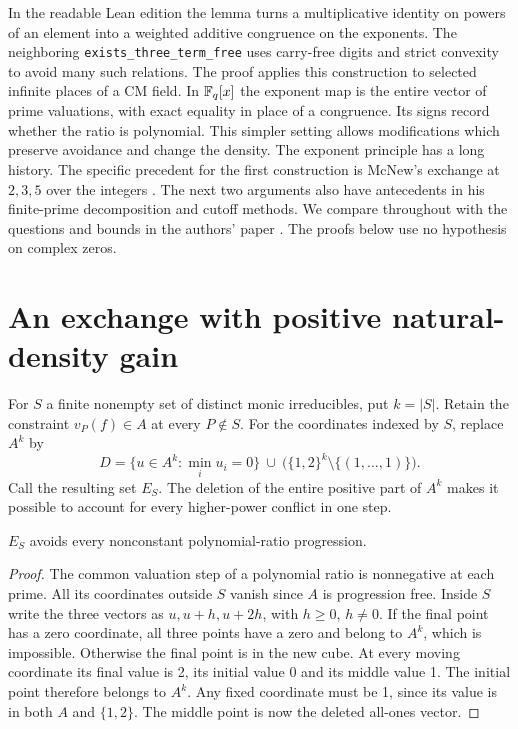 \documentclass[11pt]{article}
\begin{document}
In the readable Lean edition the lemma
turns a multiplicative identity on powers of an element into a weighted additive congruence on the exponents.
The neighboring \texttt{exists\_three\_term\_free} uses carry-free digits and strict convexity to avoid many such relations. The proof applies this construction to selected infinite places of a CM field. In $\mathbb F_q[x]$ the exponent map is the entire vector of prime valuations, with exact equality in place of a congruence. Its signs record whether the ratio is polynomial. This simpler setting allows modifications which preserve avoidance and change the density. The exponent principle has a long history. The specific precedent for the first construction is McNew's exchange at $2,3,5$ over the integers \cite[Thm.~3.3]{mcnew}. The next two arguments also have antecedents in his finite-prime decomposition and cutoff methods. We compare throughout with the questions and bounds in the authors' paper \cite{asada}. The proofs below use no hypothesis on complex zeros.

\section{An exchange with positive natural-density gain}
For $S$ a finite nonempty set of distinct monic irreducibles, put $k=|S|$. Retain the constraint $v_P(f)\in A$ at every $P\notin S$. For the coordinates indexed by $S$, replace $A^k$ by
\[
 D=\{u\in A^k:\min_i u_i=0\}\ \cup\
 \bigl(\{1,2\}^k\setminus\{(1,\ldots,1)\}\bigr).
\]
Call the resulting set $E_S$. The deletion of the entire positive part of $A^k$ makes it possible to account for every higher-power conflict in one step.

\begin{lemma}
$E_S$ avoids every nonconstant polynomial-ratio progression.
\end{lemma}
\begin{proof}
The common valuation step of a polynomial ratio is nonnegative at each prime. All its coordinates outside $S$ vanish since $A$ is progression free. Inside $S$ write the three vectors as $u,u+h,u+2h$, with $h\ge0$, $h\ne0$. If the final point has a zero coordinate, all three points have a zero and belong to $A^k$, which is impossible. Otherwise the final point is in the new cube. At every moving coordinate its final value is 2, its initial value 0 and its middle value 1. The initial point therefore belongs to $A^k$. Any fixed coordinate must be 1, since its value is in both $A$ and $\{1,2\}$. The middle point is now the deleted all-ones vector.
\end{proof}
\end{document}
